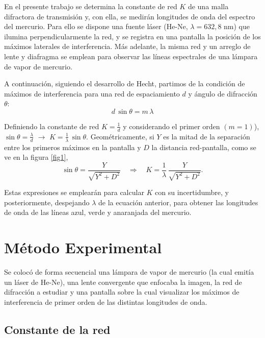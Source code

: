 \documentclass[12pt, a4paper]{article}
\begin{document}
En el presente trabajo se determina la constante de red $K$ de una malla difractora de transmisión y, con ella, se medirán 
longitudes de onda del espectro del mercurio. Para ello se dispone una fuente láser (He-Ne, $\lambda=632,8$ nm) que ilumina 
perpendicularmente la red, y se registra en una pantalla la posición de los máximos laterales de interferencia. Más adelante, la misma red 
y un arreglo de lente y diafragma se emplean para observar las líneas espectrales de una lámpara de vapor de mercurio.

A continuación, siguiendo el desarrollo de Hecht, partimos de la condición de máximos de interferencia para una red de espaciamiento $d$
y ángulo de difracción $\theta$:
\begin{equation}
  d \,\sin\theta = m \,\lambda
\label{equation1}
\end{equation}

Definiendo la constante de red $K = \frac{1}{d}$ y considerando el primer orden $(m=1)$),  
$\sin\theta = \frac{\lambda}{d}$
$\longrightarrow$
$K = \frac{1}{\lambda}\,\sin\theta$.
Geométricamente, si $Y$ es la mitad de la separación entre los primeros máximos en la pantalla y $D$ la distancia red-pantalla, como se ve 
en la figura \ref{fig1},  
\begin{equation}
  \sin\theta = \frac{Y}{\sqrt{Y^2 + D^2}}
  \quad\Longrightarrow\quad
  K = \frac{1}{\lambda}\,\frac{Y}{\sqrt{Y^2 + D^2}}.
\label{equation2}
\end{equation}

Estas expresiones se emplearán para calcular $K$ con su incertidumbre, y posteriormente, despejando $\lambda$ de la ecuación anterior, 
para obtener las longitudes de onda de las líneas azul, verde y anaranjada del mercurio.


\section{Método Experimental}

Se colocó de forma secuencial una lámpara de vapor de mercurio (la cual emitía un láser de He-Ne), una lente convergente que enfocaba 
la imagen, la red de difracción a estudiar y una pantalla sobre la cual visualizar los máximos de interferencia de primer orden de las 
distintas longitudes de onda.

\subsection{Constante de la red}
\end{document}
